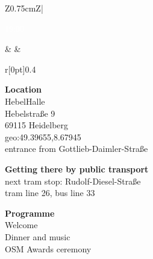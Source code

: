 \begin{landscape}
\begin{center}
    \label{social-event}%
    \enlargethispage{1\baselineskip}%
    \newlength\socialEventBoxWidth
    \setlength{\socialEventBoxWidth}{10.82cm}
    \newlength\socialEventSectionSep
    \setlength{\socialEventSectionSep}{\baselineskip}
    \noindent\begin{tabular}{Z{0.75cm}Z{\socialEventBoxWidth}|}
      \parbox[t]{\linewidth}{%
        \textcolor{white}{19:00}%
      }%
      &
      \tabularnewline
      &
      \begin{minipage}[t]{\socialEventBoxWidth}
        \noindent\begin{minipage}[t]{0.47\linewidth}
          \vspace{-0.56\baselineskip}
          \begin{wrapfigure}[6]{r}[0pt]{0.4\linewidth}%
            \vspace{-1\baselineskip}%
          \end{wrapfigure}%
          \textbf{Location}\\
          HebelHalle\\
          Hebelstraße 9\\
          69115 Heidelberg\\
          geo:49.39655,8.67945\\
          entrance from Gottlieb-Daimler-Straße

          \vspace{\socialEventSectionSep}
          \textbf{Getting there by public transport}\\
          next tram stop: Rudolf-Diesel-Straße\\
          tram line 26, bus line 33

          \vspace{\socialEventSectionSep}
          \textbf{Programme}\\
          Welcome\\
          Dinner and music\\
          OSM Awards ceremony


\end{minipage}
\end{minipage}
\end{tabular}
\end{center}
\end{landscape}
